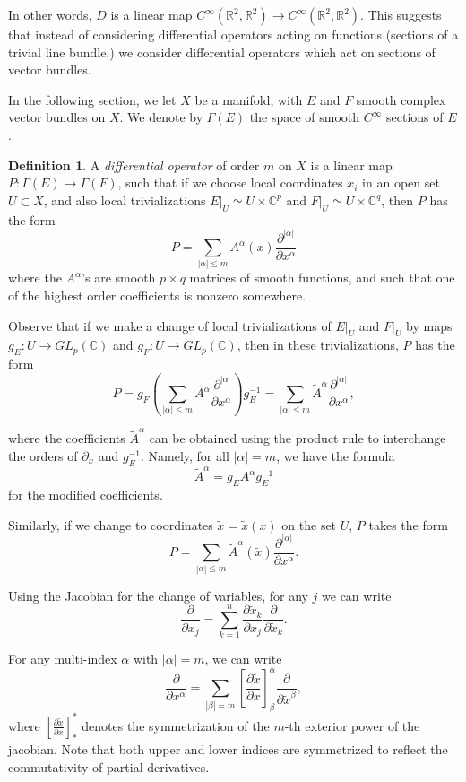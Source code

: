 \documentclass[14pt, reqno]{extarticle}
\theoremstyle{plain}
\theoremstyle{definition}
\newtheorem{definition}{Definition}[section]
\theoremstyle{remark}
\newcommand{\RR}{\mathbb{R}}
\newcommand{\CC}{\mathbb{C}}
\begin{document}
In other words, $D$ is a linear map $C^\infty(\RR^2, \RR^2) \to C^\infty(\RR^2, \RR^2)$. 
This suggests that instead of considering differential operators acting on functions 
(sections of a trivial line bundle,) we consider differential operators which 
act on sections of vector bundles. 

In the following section, we let $X$ be a manifold, with $E$ and $F$ smooth complex
vector bundles on $X$. We denote by $\Gamma(E)$ the space of smooth $C^\infty$ sections of $E$. 

\begin{definition}\label{diff}
    A \textit{differential operator} of order $m$ on $X$ is a 
    linear map $P: \Gamma(E) \to \Gamma(F)$, such that if we choose local
    coordinates $x_i$ in an open set $U \subset X$, and also local trivializations
    $E|_U \simeq U \times \CC^p$ and $F|_U \simeq U \times \CC^q$, then $P$ has the form
    \[
        P = \sum_{|\alpha| \leq m} A^\alpha(x) \frac{\partial^{|\alpha|}}{\partial x^\alpha}
    \]
    where the $A^\alpha$'s are smooth $p\times q$ matrices of smooth functions, and
    such that one of the highest order coefficients is nonzero somewhere. 
\end{definition}

Observe that if we make a change of local trivializations of $E|_U$ and $F|_U$ by maps
$g_E: U \to GL_p(\CC)$ and $g_F: U \to GL_p(\CC)$, then in these trivializations,
$P$ has the form
\[
    P = g_F\left(\sum_{|\alpha| \leq m} A^{\alpha} \frac{\partial^{|\alpha}}{\partial x^\alpha}\right)g_E^{-1}
    = \sum_{|\alpha| \leq m} \tilde{A}^\alpha \frac{\partial^{|\alpha|}}{\partial x^\alpha},
\]

where the coefficients $\tilde{A}^\alpha$ can be obtained using the product rule 
to interchange the orders of $\partial_x$ and $g_E^{-1}$. Namely, for all $|\alpha| = m$, 
we have the formula 
\[
    \tilde{A}^\alpha = g_E A^\alpha g_E^{-1}
\]
for the modified coefficients. 

Similarly, if we change to coordinates $\tilde{x} = \tilde{x}(x)$ on the set $U$, $P$ takes the form
\[
    P = \sum_{|\alpha| \leq m} \tilde{A}^\alpha(\tilde{x})\frac{\partial^{|\alpha|}}{\partial x^\alpha}.
\]

Using the Jacobian for the change of variables, for any $j$ we can write
\[
    \frac{\partial}{\partial x_j} = \sum_{k = 1}^n \frac{\partial \tilde{x}_k}{\partial x_j} \frac{\partial}{\partial \tilde{x}_k}.
\]

For any multi-index $\alpha$ with $|\alpha| = m$, we can write 
\[
    \frac{\partial}{\partial x^\alpha} = \sum_{|\beta| = m} \left[\frac{\partial\tilde{x}}{\partial x}\right]_\beta^\alpha \frac{\partial}{\partial \tilde{x}^\beta},
\]
where $\left[\frac{\partial\tilde{x}}{\partial x}\right]_*^*$ denotes the symmetrization of the $m$-th exterior 
power of the jacobian. Note that both upper and lower indices are symmetrized to reflect the commutativity 
of partial derivatives. 
\end{document}
